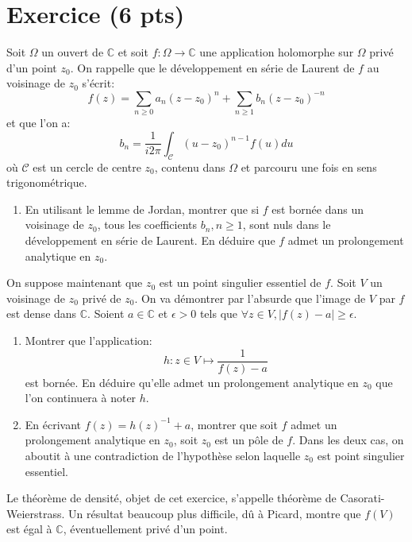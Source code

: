 \documentclass[a4paper,12pt]{amsart}
\begin{document}
\section*{Exercice (6 pts)} 
Soit $\Omega$ un ouvert de $\mathbb{C}$ et soit $f \colon \Omega \to
\mathbb{C}$ une application holomorphe sur $\Omega$ privé d'un point
$z_0$. On rappelle que le développement en série de Laurent de $f$ au
voisinage de $z_0$ s'écrit:
\[
f(z) = \sum_{n \geq 0}a_n (z-z_0)^n + \sum_{n \geq 1}b_n (z-z_0)^{-n}
\]
et que l'on a:
\[
b_n = \frac{1}{i2 \pi} \int_{\mathcal{C}} (u-z_0)^{n-1} f(u) du
\]
où $\mathcal{C}$ est un cercle de centre $z_0$, contenu dans $\Omega$
et parcouru une fois en sens trigonométrique.
\begin{enumerate}
\item En utilisant le lemme de Jordan, montrer que si $f$ est bornée
  dans un voisinage de $z_0$, tous les coefficients $b_n, n \geq 1$,
  sont nuls dans le développement en série de Laurent. En déduire que
  $f$ admet un prolongement analytique en $z_0$.
\end{enumerate}
 On suppose maintenant que $z_0$ est un point singulier essentiel
  de $f$. Soit $V$ un voisinage de $z_0$ privé de $z_0$. On va
  démontrer par l'absurde que l'image de $V$ par $f$ est dense dans
  $\mathbb{C}$.
Soient $a \in \mathbb{C}$ et $\epsilon > 0$ tels que $\forall z \in V,
|f(z)-a| \geq \epsilon$.
\begin{enumerate}[resume]
\item Montrer que l'application:
\[
h \colon z \in V \mapsto \frac{1}{f(z)-a}
\]
est bornée. En déduire qu'elle admet un prolongement analytique en
$z_0$ que l'on continuera à noter $h$.
\item En écrivant $f(z) = h(z)^{-1}+a$, montrer que soit $f$ admet un prolongement analytique en
  $z_0$, soit $z_0$ est un pôle de $f$. Dans les deux cas, on aboutit
  à une contradiction de l'hypothèse selon laquelle
  $z_0$ est point singulier essentiel. 
\end{enumerate}
Le théorème de densité, objet de cet exercice, s'appelle théorème de
Casorati-Weierstrass. Un résultat beaucoup plus difficile, dû à
Picard, montre que $f(V)$ est égal à $\mathbb{C}$, éventuellement
privé d'un point.
\end{document}
